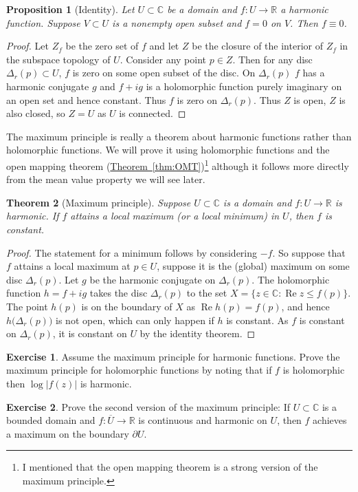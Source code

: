\documentclass[12pt,openany]{book}
\renewcommand{\Re}{\operatorname{Re}}
\newcommand{\sabs}[1]{\lvert {#1} \rvert}
\newcommand{\C}{{\mathbb{C}}}
\newcommand{\R}{{\mathbb{R}}}
\theoremstyle{plain}
\newtheorem{thm}{Theorem}[section]
\newtheorem{prop}[thm]{Proposition}
\theoremstyle{remark}
\theoremstyle{definition}
\newenvironment{exbox}{%
    \def\FrameCommand{\vrule width 1pt \relax\hspace {10pt}}%
    \MakeFramed {\advance \hsize -\width \FrameRestore }%
}{%
    \endMakeFramed
}
\theoremstyle{exercise}
\newtheorem{exercise}{Exercise}[section]
\theoremstyle{example}
\newcommand{\thmref}[1]{\hyperref[#1]{Theorem~\ref*{#1}}}
\begin{document}
\begin{prop}[Identity]
Let $U \subset \C$ be a domain and $f \colon U \to \R$ a harmonic function.
Suppose $V \subset U$ is a nonempty open subset and $f = 0$ on $V$.  Then $f
\equiv 0$.
\end{prop}

\begin{proof}
Let $Z_f$ be the zero set of $f$ and let $Z$ be the closure of the interior
of $Z_f$ in the subspace topology of $U$.
Consider any point $p \in Z$.  Then for any disc $\Delta_r(p) \subset U$, $f$ is
zero on some open subset of the disc.  On $\Delta_r(p)$ $f$ has a harmonic
conjugate $g$ and $f+i g$ is a holomorphic function purely imaginary on an
open set and hence constant.  Thus $f$ is zero on $\Delta_r(p)$.  Thus $Z$
is open, $Z$ is also closed, so $Z=U$ as $U$ is connected.
\end{proof}

The maximum principle is really a theorem about harmonic functions rather
than holomorphic functions.  We will prove it using holomorphic functions
and the open mapping theorem (\thmref{thm:OMT})\footnote{I mentioned that
the open mapping theorem is a strong version of the maximum principle.}
although it follows more directly from the mean value property we will see
later.

\begin{thm}[Maximum principle]
%
Suppose $U \subset \C$ is a domain and $f \colon U \to \R$
is harmonic.  If $f$ attains a local maximum (or a local minimum) in $U$, then $f$ is constant.
\end{thm}

\begin{proof}
The statement for a minimum follows by considering $-f$.  So suppose that
$f$ attains a local maximum at $p \in U$, suppose it is the (global)
maximum on some disc $\Delta_r(p)$.  Let $g$ be the harmonic conjugate on
$\Delta_r(p)$.  The holomorphic function $h = f+ig$ takes the disc
$\Delta_r(p)$ to the set $X = \{ z \in \C : \Re z \leq f(p) \}$.  The
point $h(p)$ is on the boundary of $X$ as $\Re h(p)= f(p)$, and hence
$h\bigl(\Delta_r(p)\bigr)$ is not open, which can only happen if $h$ is
constant.  As $f$ is constant on $\Delta_r(p)$, it is constant on $U$ by the
identity theorem.
\end{proof}

\begin{exbox}
\begin{exercise}
Assume the maximum principle for harmonic functions.  Prove the maximum
principle for holomorphic functions by noting that if $f$ is holomorphic
then $\log \sabs{f(z)}$ is harmonic.
\end{exercise}

\begin{exercise}
Prove the second version of the maximum principle: If $U \subset \C$
is a bounded domain and $f \colon \overline{U}
\to \R$ is continuous and harmonic on $U$, then $f$ achieves a maximum
on the boundary $\partial U$.
\end{exercise}
\end{exbox}
\end{document}
